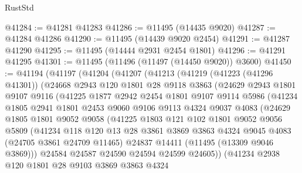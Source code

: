 \begin{lexlean}{RustStd}
\begin{coremodule}
@41284 := @41281 @41283
@41286 := @11495 (@14435 @9020)
@41287 := @41284 @41286
@41290 := @11495 (@14439 @9020 @2454)
@41291 := @41287 @41290
@41295 := @11495 (@14444 @2931 @2454 @1801)
@41296 := @41291 @41295
@41301 := @11495 (@11496 (@11497 (@14450 @9020)) @3600)
@41450 := @41194
    (@41197
      (@41204
        (@41207
          (@41213
            (@41219
              (@41223 (@41296 @41301))
              (@24668
                @2943
                @120
                @1801
                @28
                @9118
                @3863
                (@24629
                  @2943
                  @1801
                  @9107
                  @9116
                  (@41225
                    @1877
                    @2942
                    @2454
                    @1801
                    @9107
                    @9114
                    @5986
                    (@41234
                      @1805
                      @2941
                      @1801
                      @2453
                      @9060
                      @9106
                      @9113
                      @4324
                      @9037
                      @4083
                      (@24629
                        @1805
                        @1801
                        @9052
                        @9058
                        (@41225
                          @1803
                          @121
                          @102
                          @1801
                          @9052
                          @9056
                          @5809
                          (@41234
                            @118
                            @120
                            @13
                            @28
                            @3861
                            @3869
                            @3863
                            @4324
                            @9045
                            @4083
                            (@24705 @3861 @24709 @11465)
                            @24837
                            @14411
                            (@11495 (@13309 @9046 @3869)))
                          @24584
                          @24587
                          @24590
                          @24594
                          @24599
                          @24605))
                      (@41234
                        @2938
                        @120
                        @1801
                        @28
                        @9103
                        @3869
                        @3863
                        @4324

\end{coremodule}
\end{lexlean}
